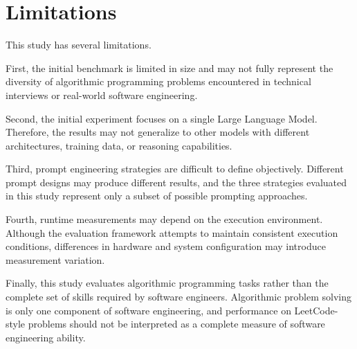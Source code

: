 \section{Limitations}

This study has several limitations.

First, the initial benchmark is limited in size and may not fully represent
the diversity of algorithmic programming problems encountered in technical
interviews or real-world software engineering.

Second, the initial experiment focuses on a single Large Language Model.
Therefore, the results may not generalize to other models with different
architectures, training data, or reasoning capabilities.

Third, prompt engineering strategies are difficult to define objectively.
Different prompt designs may produce different results, and the three
strategies evaluated in this study represent only a subset of possible
prompting approaches.

Fourth, runtime measurements may depend on the execution environment.
Although the evaluation framework attempts to maintain consistent execution
conditions, differences in hardware and system configuration may introduce
measurement variation.

Finally, this study evaluates algorithmic programming tasks rather than the
complete set of skills required by software engineers. Algorithmic problem
solving is only one component of software engineering, and performance on
LeetCode-style problems should not be interpreted as a complete measure of
software engineering ability.
